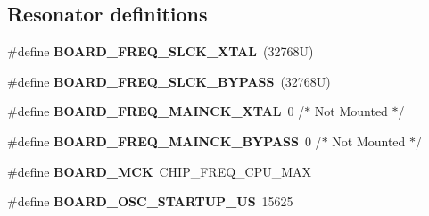 \subsection*{Resonator definitions}
\begin{DoxyCompactItemize}
\item 
\hypertarget{group__saml21__xplained__pro__features__group_ga29729f712d94e421615d41fbf2748311}{}\#define {\bfseries B\+O\+A\+R\+D\+\_\+\+F\+R\+E\+Q\+\_\+\+S\+L\+C\+K\+\_\+\+X\+T\+A\+L}~(32768\+U)\label{group__saml21__xplained__pro__features__group_ga29729f712d94e421615d41fbf2748311}

\item 
\hypertarget{group__saml21__xplained__pro__features__group_gadf99a31614b830d438308afe88d4bc35}{}\#define {\bfseries B\+O\+A\+R\+D\+\_\+\+F\+R\+E\+Q\+\_\+\+S\+L\+C\+K\+\_\+\+B\+Y\+P\+A\+S\+S}~(32768\+U)\label{group__saml21__xplained__pro__features__group_gadf99a31614b830d438308afe88d4bc35}

\item 
\hypertarget{group__saml21__xplained__pro__features__group_gaf114fed8746a25b7afa90614bd2150bb}{}\#define {\bfseries B\+O\+A\+R\+D\+\_\+\+F\+R\+E\+Q\+\_\+\+M\+A\+I\+N\+C\+K\+\_\+\+X\+T\+A\+L}~0 /$\ast$ Not Mounted $\ast$/\label{group__saml21__xplained__pro__features__group_gaf114fed8746a25b7afa90614bd2150bb}

\item 
\hypertarget{group__saml21__xplained__pro__features__group_ga4242232aa80f183e350266e7b422b12d}{}\#define {\bfseries B\+O\+A\+R\+D\+\_\+\+F\+R\+E\+Q\+\_\+\+M\+A\+I\+N\+C\+K\+\_\+\+B\+Y\+P\+A\+S\+S}~0 /$\ast$ Not Mounted $\ast$/\label{group__saml21__xplained__pro__features__group_ga4242232aa80f183e350266e7b422b12d}

\item 
\hypertarget{group__saml21__xplained__pro__features__group_gae9cca1603768bb2e6c82bd0ccedf2b5c}{}\#define {\bfseries B\+O\+A\+R\+D\+\_\+\+M\+C\+K}~C\+H\+I\+P\+\_\+\+F\+R\+E\+Q\+\_\+\+C\+P\+U\+\_\+\+M\+A\+X\label{group__saml21__xplained__pro__features__group_gae9cca1603768bb2e6c82bd0ccedf2b5c}

\item 
\hypertarget{group__saml21__xplained__pro__features__group_ga72c1c5d05c0eee527f680ead3d7c3f09}{}\#define {\bfseries B\+O\+A\+R\+D\+\_\+\+O\+S\+C\+\_\+\+S\+T\+A\+R\+T\+U\+P\+\_\+\+U\+S}~15625\label{group__saml21__xplained__pro__features__group_ga72c1c5d05c0eee527f680ead3d7c3f09}

\end{DoxyCompactItemize}
